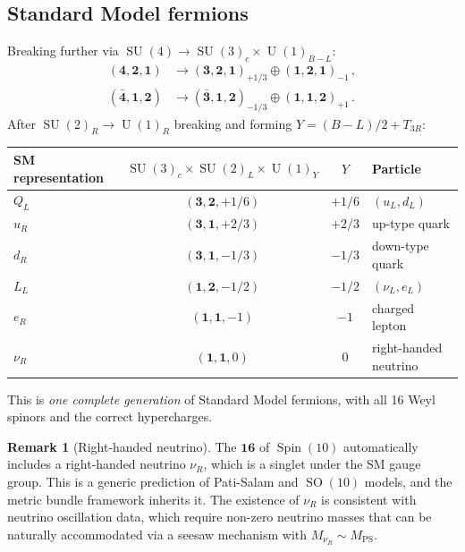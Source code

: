 \documentclass[12pt,a4paper]{article}
\theoremstyle{definition}
\newtheorem{remark}[theorem]{Remark}
\newcommand{\SO}{\operatorname{SO}}
\newcommand{\SU}{\operatorname{SU}}
\newcommand{\U}{\operatorname{U}}
\newcommand{\Spin}{\operatorname{Spin}}
\begin{document}
\subsection{Standard Model fermions}

Breaking further via $\SU(4) \to \SU(3)_c \times \U(1)_{B-L}$:
\begin{align}
(\mathbf{4}, \mathbf{2}, \mathbf{1}) &\to (\mathbf{3}, \mathbf{2}, \mathbf{1})_{+1/3} \oplus (\mathbf{1}, \mathbf{2}, \mathbf{1})_{-1}\,,\\
(\bar{\mathbf{4}}, \mathbf{1}, \mathbf{2}) &\to (\bar{\mathbf{3}}, \mathbf{1}, \mathbf{2})_{-1/3} \oplus (\mathbf{1}, \mathbf{1}, \mathbf{2})_{+1}\,.
\end{align}
After $\SU(2)_R \to \U(1)_R$ breaking and forming $Y = (B{-}L)/2 + T_{3R}$:

\begin{center}
\begin{tabular}{lccl}
\toprule
SM representation & $\SU(3)_c \times \SU(2)_L \times \U(1)_Y$ & $Y$ & Particle \\
\midrule
$Q_L$ & $(\mathbf{3}, \mathbf{2}, +1/6)$ & $+1/6$ & $(u_L, d_L)$ \\
$u_R$ & $(\mathbf{3}, \mathbf{1}, +2/3)$ & $+2/3$ & up-type quark \\
$d_R$ & $(\mathbf{3}, \mathbf{1}, -1/3)$ & $-1/3$ & down-type quark \\
$L_L$ & $(\mathbf{1}, \mathbf{2}, -1/2)$ & $-1/2$ & $(\nu_L, e_L)$ \\
$e_R$ & $(\mathbf{1}, \mathbf{1}, -1)$ & $-1$ & charged lepton \\
$\nu_R$ & $(\mathbf{1}, \mathbf{1}, 0)$ & $0$ & right-handed neutrino \\
\bottomrule
\end{tabular}
\end{center}

\noindent
This is \emph{one complete generation} of Standard Model fermions, with all 16 Weyl spinors and the correct hypercharges.

\begin{remark}[Right-handed neutrino]
The $\mathbf{16}$ of $\Spin(10)$ automatically includes a right-handed neutrino $\nu_R$, which is a singlet under the SM gauge group.
This is a generic prediction of Pati-Salam and $\SO(10)$ models, and the metric bundle framework inherits it.
The existence of $\nu_R$ is consistent with neutrino oscillation data, which require non-zero neutrino masses that can be naturally accommodated via a seesaw mechanism with $M_{\nu_R} \sim M_{\mathrm{PS}}$.
\end{remark}
\end{document}
